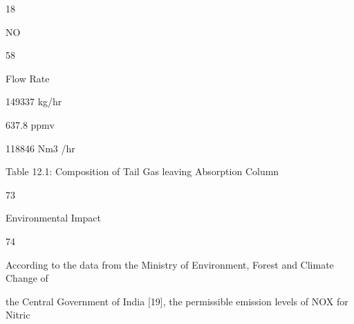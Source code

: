 \documentclass[a4paper,portrait,12pt]{article}
\begin{document}
18





\begin{flushleft}
NO
\end{flushleft}





58





\begin{flushleft}
Flow Rate
\end{flushleft}





\begin{flushleft}
149337 kg/hr
\end{flushleft}





\begin{flushleft}
637.8 ppmv
\end{flushleft}


\begin{flushleft}
118846 Nm3 /hr
\end{flushleft}





\begin{flushleft}
Table 12.1: Composition of Tail Gas leaving Absorption Column
\end{flushleft}





73





\begin{flushleft}
\newpage
Environmental Impact
\end{flushleft}





74





\begin{flushleft}
According to the data from the Ministry of Environment, Forest and Climate Change of
\end{flushleft}


\begin{flushleft}
the Central Government of India [19], the permissible emission levels of NOX for Nitric
\end{flushleft}
\end{document}

